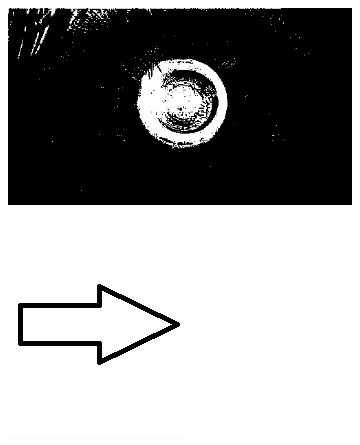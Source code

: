 \documentclass{article}
\begin{document}
\begin{figure}[H]
\centering
\begin{subfigure}{.47\textwidth}
  \centering
  \includegraphics[width=0.97\linewidth]{_Figures/raw_data_1_binary.png}
  \caption{}
  \label{fig:raw_1}
\end{subfigure}%
\begin{subfigure}{.09\textwidth}
  \centering
  \includegraphics[width=0.97\linewidth]{_Figures/leftrightarrow.jpg}
  \label{fig:arrow}
\end{subfigure}%

\end{figure}
\end{document}
